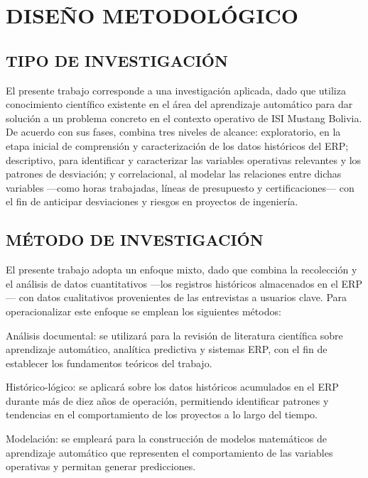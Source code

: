 \documentclass{univalle-perfil}
\begin{document}
\section{DISEÑO METODOLÓGICO}

\subsection{TIPO DE INVESTIGACIÓN}

El presente trabajo corresponde a una investigación aplicada, dado que utiliza conocimiento científico existente en el área del aprendizaje automático para dar solución a un problema concreto en el contexto operativo de ISI Mustang Bolivia. De acuerdo con sus fases, combina tres niveles de alcance: exploratorio, en la etapa inicial de comprensión y caracterización de los datos históricos del ERP; descriptivo, para identificar y caracterizar las variables operativas relevantes y los patrones de desviación; y correlacional, al modelar las relaciones entre dichas variables —como horas trabajadas, líneas de presupuesto y certificaciones— con el fin de anticipar desviaciones y riesgos en proyectos de ingeniería.

\subsection{MÉTODO DE INVESTIGACIÓN}

El presente trabajo adopta un enfoque mixto, dado que combina la recolección y el análisis de datos cuantitativos —los registros históricos almacenados en el ERP— con datos cualitativos provenientes de las entrevistas a usuarios clave. Para operacionalizar este enfoque se emplean los siguientes métodos:

Análisis documental: se utilizará para la revisión de literatura científica sobre aprendizaje automático, analítica predictiva y sistemas ERP, con el fin de establecer los fundamentos teóricos del trabajo.

Histórico-lógico: se aplicará sobre los datos históricos acumulados en el ERP durante más de diez años de operación, permitiendo identificar patrones y tendencias en el comportamiento de los proyectos a lo largo del tiempo.

Modelación: se empleará para la construcción de modelos matemáticos de aprendizaje automático que representen el comportamiento de las variables operativas y permitan generar predicciones.
\end{document}
